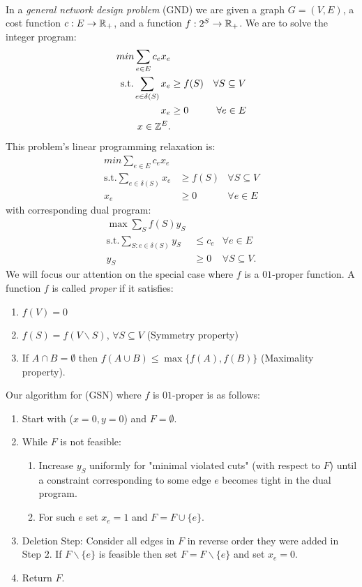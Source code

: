 \documentclass[letterpaper,12pt,oneside,onecolumn]{article}
\begin{document}
\paragraph{}
In a {\it general network design problem} (GND) we are given a graph $G = (V,E)$, a cost function $c : E \rightarrow \mathbb{R}_+$, and a function $f: 2^S \rightarrow \mathbb{R}_+$. We are to solve the integer program:
\begin{align*}
min \sum_{e \in E} c_e x_e  &\ \\
\text{s.t.} \sum_{e \in \delta(S)} x_e &\geq f(S) &\forall S \subseteq V\\
x_e &\geq 0 &\forall e \in E \\
x \in \mathbb{Z}^E.
\end{align*}
This problem's linear programming relaxation is:
\begin{align*}
min \sum_{e \in E} c_e x_e  &\ \\
\text{s.t.} \sum_{e \in \delta(S)} x_e &\geq f(S) &\forall S \subseteq V \\
x_e &\geq 0 &\forall e \in E 
\end{align*}
with corresponding dual program:
\begin{align*}
\max \sum_{S} f(S)y_S &\ \\
\text{s.t.} \sum_{S : e \in \delta(S)} y_S &\leq c_e &\forall e \in E \\
y_S &\geq 0 &\forall S \subseteq V.
\end{align*}
We will focus our attention on the special case where $f$ is a $01$-proper function. A function $f$ is called {\it proper} if it satisfies:
\begin{enumerate}
\item $f(V) = 0$
\item $f(S) = f(V\backslash S)$, $\forall S\subseteq V$ (Symmetry property)
\item If $A \cap B = \emptyset$ then $f(A \cup B) \leq \max \{f(A), f(B)\}$ (Maximality property).
\end{enumerate}
Our algorithm for (GSN) where $f$ is $01$-proper is as follows:
\begin{enumerate}
\item Start with ($x=0,y=0$) and $F = \emptyset$.
\item While $F$ is not feasible:
	\begin{enumerate}
	\item Increase $y_S$ uniformly for "minimal violated cuts" (with respect to $F$) until a constraint corresponding to some edge $e$ becomes tight in the dual program.
	\item For such $e$ set $x_e = 1$ and $F = F \cup \{e\}$.
	\end{enumerate}
\item Deletion Step: Consider all edges in $F$ in reverse order they were added in Step $2$. If $F\backslash\{e\}$ is feasible then set $F = F\backslash\{e\}$ and set $x_e = 0$.
\item Return $F$.
\end{enumerate}
\end{document}
